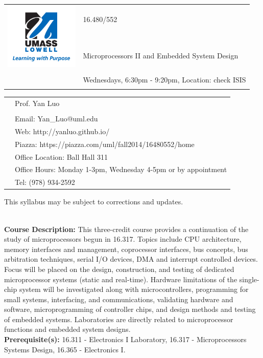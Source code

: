 \documentclass[11pt]{article}
\begin{document}
\begin{tabular}{ l l }
  \multirow{3}{*}{\includegraphics[height=1.25in]{UML-logo.png}} & \LARGE 16.480/552 \\\\
  & \LARGE Microprocessors II and Embedded System Design \\\\
  & \LARGE Wednesdays, 6:30pm - 9:20pm, Location: check ISIS \\\\
\end{tabular}
\vspace{10mm}

\begin{tabular}{ l l }
  \multirow{6}{*}{} & \large Prof. Yan Luo \\\\
  & \large Email: Yan\_Luo@uml.edu \\
  & \large Web: http://yanluo.github.io/ \\
  & \large Piazza: https://piazza.com/uml/fall2014/16480552/home \\
  & \large Office Location: Ball Hall 311 \\
  & \large Office Hours: Monday 1-3pm, Wednesday 4-5pm or by appointment \\
  & \large Tel: (978) 934-2592 \\
\end{tabular}
\vspace{5mm}
\begin{center} This syllabus may be subject to corrections and updates. \\
\end{center}

\textbf {\large \\ Course Description:} 
This three-credit course provides a continuation of the study of microprocessors begun in 16.317. Topics include CPU architecture, memory interfaces and management, coprocessor interfaces, bus concepts, bus arbitration techniques, serial I/O devices, DMA and interrupt controlled devices. Focus will be placed on the design, construction, and testing of dedicated microprocessor systems (static and real-time). Hardware limitations of the single-chip system will be investigated along with microcontrollers, programming for small systems, interfacing, and communications, validating hardware and software, microprogramming of controller chips, and design methods and testing of embedded systems. Laboratories are directly related to microprocessor functions and embedded system designs. \\
\textbf {Prerequisite(s):} 16.311 - Electronics I Laboratory, 16.317 - Microprocessors Systems Design, 16.365 - Electronics I.
\end{document}
